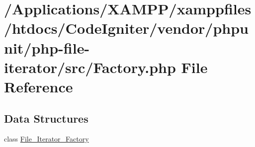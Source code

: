 \hypertarget{phpunit_2php-file-iterator_2src_2_factory_8php}{}\section{/\+Applications/\+X\+A\+M\+P\+P/xamppfiles/htdocs/\+Code\+Igniter/vendor/phpunit/php-\/file-\/iterator/src/\+Factory.php File Reference}
\label{phpunit_2php-file-iterator_2src_2_factory_8php}
\subsection*{Data Structures}
\begin{DoxyCompactItemize}
\item 
class \mbox{\hyperlink{class_file___iterator___factory}{File\+\_\+\+Iterator\+\_\+\+Factory}}
\end{DoxyCompactItemize}
